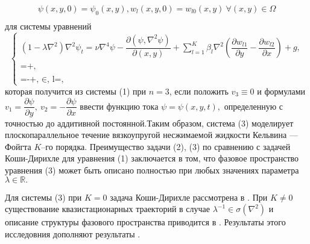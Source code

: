\begin{equation}
\begin{array}{l}
\psi(x,y,0)=\psi_{0}(x,y), w_{l}(x,y,0)=w_{l0}(x,y) ~ \forall(x,y)\in\Omega \\
\mathop{\mathop{
\psi(x,y,t)=\nabla^{2}\psi(x,y,t)=0, w_{l}(x,y,t)=0 ~ \forall(x,y,t)\in\partial\Omega\times {\mathbb{R}}
\quad}\limits^{\ }}
\end{array}
\end{equation}%
для системы уравнений
\begin{equation}
\left \{
\begin{array}{l}
(1- \lambda {\nabla}^2)\nabla^{2}\psi_{t}=\nu\nabla^{4}\psi-\dfrac{\partial(\psi,\nabla^{2}\psi)}{\partial(x,y)}+\displaystyle\sum_{l=1}^K\beta_{l}\nabla^{2}\left(\dfrac{\partial w_{l1}}{\partial y}-\dfrac{\partial w_{l2}}{\partial x}\right)+g ,  \\
{\displaystyle\mathop{\mathop{\dfrac{\partial w_{l1}}{\partial t}}=\frac{\partial\psi}{\partial y}+\alpha_{l} w_{l1},\quad}\limits^{\ }}\\
{\displaystyle\mathop{\mathop{\dfrac{\partial w_{l2}}{\partial t}}=-\frac{\partial\psi}{\partial x}+\alpha_{l} w_{l2},~ \alpha_{l}\in {\mathbb{R_-}},~ l=\overline{1,~K}, \quad}\limits^{\ }}\end{array}\right.
\end{equation}%
которая получится из системы (1) при $ n=3 $, если положить $ v_{3}\equiv 0 $ и формулами $ v_{1}=\dfrac{\partial\psi}{\partial y},~ v_{2}=-\dfrac{\partial\psi}{\partial x} $ ввести функцию тока $ \psi=\psi(x,y,t), $ определенную с точностью до аддитивной постоянной.Таким образом, система (3) моделирует плоскопараллельное течение вязкоупругой несжимаемой  жидкости Кельвина --- Фойгта $K$--го порядка. Преимущество  задачи (2), (3) по сравнению с задачей Коши-Дирихле для уравнения (1) заключается в том, что фазовое пространство \cite{rrr6}  уравнения (3) может быть описано полностью при любых значениях параметра $ \lambda\in {\mathbb{R}}. $

Для системы (3) при $ K=0 $ задача Коши-Дирихле рассмотрена в \cite{rrr7}. При $ K\neq0 $  существование квазистационарных траекторий  в случае $ \lambda^{-1}\in\sigma(\nabla^{2}) $ и описание структуры фазового пространства приводится в \cite{rrr8}. Результаты этого исследовния дополняют результаты \cite{rrr9}.




